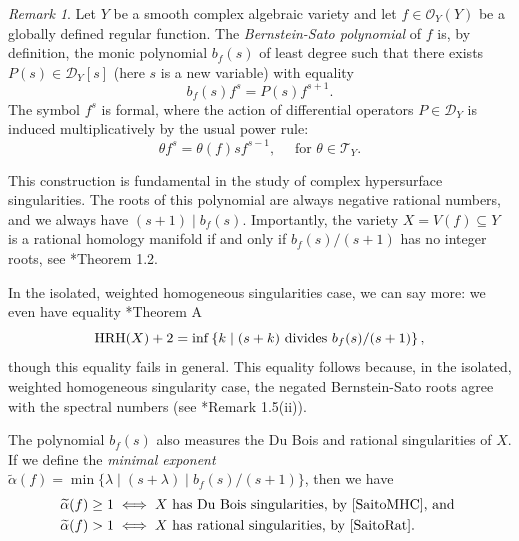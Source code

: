 \documentclass[letterpaper,11pt]{amsart}
\theoremstyle{plain}
\theoremstyle{definition}
\theoremstyle{remark}
\newtheorem{rmk}[thm]{Remark}
\def\cD{\mathcal{D}}
\def\cO{\mathcal{O}}
\def\cT{\mathcal{T}}
\begin{document}
\begin{rmk} Let $Y$ be a smooth complex algebraic variety and let $f\in \cO_Y(Y)$ be a globally defined regular function. The \emph{Bernstein-Sato polynomial} of $f$ is, by definition, the monic polynomial $b_f(s)$ of least degree such that there exists $P(s) \in \mathcal D_Y[s]$ (here $s$ is a new variable) with equality
\[ b_f(s) f^s = P(s) f^{s+1}.\]
The symbol $f^s$ is formal, where the action of differential operators $P \in \cD_Y$ is induced multiplicatively by the usual power rule:
\[ \theta f^s = \theta(f) s f^{s-1}, \quad \text{ for } \theta \in \cT_Y.\]

This construction is fundamental in the study of complex hypersurface singularities. The roots of this polynomial are always negative rational numbers, and we always have $(s+1) \mid b_f(s)$. Importantly, the variety $X = V(f) \subseteq Y$ is a rational homology manifold if and only if $b_f(s)/(s+1)$ has no integer roots, see \cite{Torrelli}*{Theorem 1.2}.

In the isolated, weighted homogeneous singularities case, we can say more: we even have equality \cite{DOR2}*{Theorem A}
\begin{equation} \label{eq-IsolatedWeightHomog} {\rm HRH}(X) + 2 = \inf \left\{k \mid (s+k) \text{ divides } b_f(s)/(s+1)\right\},\end{equation}
though this equality fails in general. This equality follows because, in the isolated, weighted homogeneous singularity case, the negated Bernstein-Sato roots agree with the spectral numbers (see \cite{JKSYSpectrum}*{Remark 1.5(ii)}).

The polynomial $b_f(s)$ also measures the Du Bois and rational singularities of $X$. If we define the \emph{minimal exponent} $\widetilde{\alpha}(f) = \min\{\lambda \mid (s+\lambda) \mid b_f(s)/(s+1)\}$, then we have
\begin{align*} \widetilde{\alpha}(f) \geq 1 &\iff X \text{ has Du Bois singularities, by \cite{SaitoMHC}, and }\\
\widetilde{\alpha}(f) > 1 &\iff X \text{ has rational singularities, by \cite{SaitoRat}}.
\end{align*}
\end{rmk}
\end{document}
